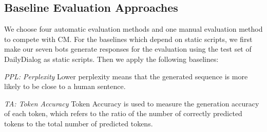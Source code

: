  
\subsection{Baseline Evaluation Approaches}
We choose four automatic evaluation methods and one manual evaluation 
method to compete with CM. 
For the baselines which depend on static scripts,
we first make our seven bots 
generate responses for the 
evaluation
using
the test set of DailyDialog \citep{li-etal-2017-dailydialog} 
as static scripts. 
Then we apply the following baselines:

\noindent
\textit{PPL: Perplexity} 
Lower perplexity means that the generated sequence is 
more likely to be close to a human sentence.

\noindent 
\textit{TA: Token Accuracy}
Token Accuracy is used to measure the generation accuracy 
of each token, which refers to the ratio of the number of 
correctly predicted tokens to the total number of predicted tokens.


